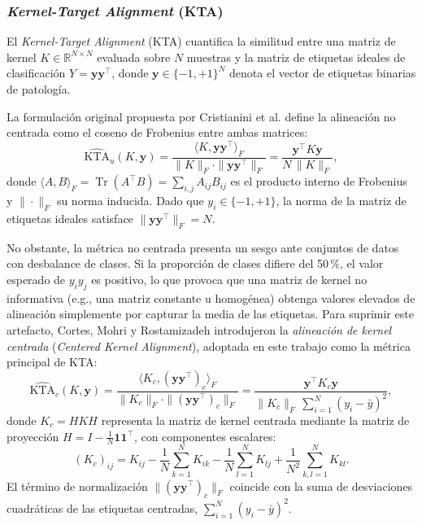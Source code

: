 
\subsubsection{\textit{Kernel-Target Alignment} (KTA)}

El \textit{Kernel-Target Alignment} (KTA) cuantifica la similitud entre una matriz de
kernel $K \in \mathbb{R}^{N \times N}$ evaluada sobre $N$ muestras y la matriz de etiquetas
ideales de clasificación $Y = \mathbf{y}\mathbf{y}^\top$, donde $\mathbf{y} \in \{-1, +1\}^N$
denota el vector de etiquetas binarias de patología.

La formulación original propuesta por Cristianini et al. \cite{cristianini2002kernel}
define la alineación no centrada como el coseno de Frobenius entre ambas matrices:
\begin{equation}
  \widehat{\text{KTA}}_u(K, \mathbf{y}) =
  \frac{\langle K, \mathbf{y}\mathbf{y}^\top \rangle_F}{\|K\|_F \cdot \|\mathbf{y}\mathbf{y}^\top\|_F} =
  \frac{\mathbf{y}^\top K \mathbf{y}}{N\,\|K\|_F},
  \label{eq:kta_uncentered}
\end{equation}
donde $\langle A, B \rangle_F = \operatorname{Tr}(A^\top B) = \sum_{i,j} A_{ij} B_{ij}$ es el
producto interno de Frobenius y $\|\cdot\|_F$ su norma inducida. Dado que $y_i \in \{-1, +1\}$,
la norma de la matriz de etiquetas ideales satisface $\|\mathbf{y}\mathbf{y}^\top\|_F = N$.

No obstante, la métrica no centrada presenta un sesgo ante conjuntos de datos con
desbalance de clases. Si la proporción de clases difiere del 50\,\%, el valor esperado de
$y_i y_j$ es positivo, lo que provoca que una matriz de kernel no informativa
(e.g., una matriz constante u homogénea) obtenga valores elevados
de alineación simplemente por capturar la media de las etiquetas. Para suprimir este artefacto,
Cortes, Mohri y Rostamizadeh \cite{Cortes2012} introdujeron la \textit{alineación de kernel centrada}
(\textit{Centered Kernel Alignment}), adoptada en este trabajo como la métrica principal de KTA:
\begin{equation}
  \widehat{\text{KTA}}_c(K, \mathbf{y}) =
  \frac{\langle K_c, (\mathbf{y}\mathbf{y}^\top)_c \rangle_F}{\|K_c\|_F \cdot \|(\mathbf{y}\mathbf{y}^\top)_c\|_F} =
  \frac{\mathbf{y}^\top K_c \mathbf{y}}{\|K_c\|_F\,\sum_{i=1}^N (y_i - \bar{y})^2},
  \label{eq:kta_centered}
\end{equation}
donde $K_c = H K H$ representa la matriz de kernel centrada mediante la matriz de proyección
$H = I - \frac{1}{N}\mathbf{1}\mathbf{1}^\top$, con componentes escalares:
\begin{equation}
  (K_c)_{ij} = K_{ij} - \frac{1}{N}\sum_{k=1}^N K_{ik} - \frac{1}{N}\sum_{l=1}^N K_{lj} + \frac{1}{N^2}\sum_{k,l=1}^N K_{kl}.
  \label{eq:kernel_centering_scalar}
\end{equation}
El término de normalización $\|(\mathbf{y}\mathbf{y}^\top)_c\|_F$ coincide con la
suma de desviaciones cuadráticas de las etiquetas centradas, $\sum_{i=1}^N (y_i - \bar{y})^2$.

